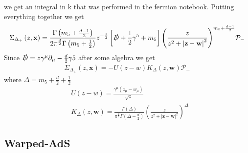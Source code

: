 \documentclass[12pt,a4paper]{article}
\begin{document}
we get an integral in k that was performed in the fermion notebook. Putting everything together we get
\begin{align}
    \Sigma_{\Delta_{+}} \left(z, \mathbf{x}\right) = \frac{\Gamma\left( m_5 + \frac{d-1}{2}\right)}{2 \pi^{\frac{d}{2}} \Gamma\left( m_5 + \frac{1}{2}\right)} z^{-\frac{1}{2}} \left[ \slashed{D} + \frac{1}{2}\gamma^5+ m_5 \right] {\left(\frac{z}{z^2+{\left| \mathbf{z} - \mathbf{w} \right|}^2}\right)}^{m_5 + \frac{d-1}{2}} \mathcal{P}_{-}
\end{align}
Since $\slashed{D} = z \gamma^{\mu} \partial_\mu - \frac{d}{2} \gamma5 $ after some algebra we get
\begin{align}
    \Sigma_{\Delta_{+}} \left(z, \mathbf{x}\right) = - U \left(z - w \right) K_\Delta \left(z, \mathbf{w}\right) \mathcal{P}_{-}
\end{align}
where $\Delta = m_5 + \frac{d}{2} + \frac{1}{2}$ 
\begin{align}
    & U\left(z - w \right) = \frac{\gamma^{\mu} \left( z_\mu - w_\mu \right)}{\sqrt{z}} \\
    & K_\Delta \left(z, \mathbf{w}\right) = \frac{\Gamma\left( \Delta \right)}{\pi^{\frac{d}{2}} \Gamma\left( \Delta - \frac{d}{2} \right)} {\left( \frac{z}{z^2 + {\left| \mathbf{z} - \mathbf{w} \right|}^2} \right)}^\Delta
\end{align}
\subsection{Warped-AdS}
\end{document}
